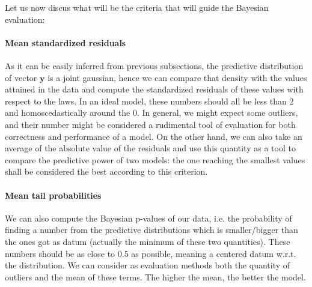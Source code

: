 \documentclass[11pt,twoside]{report}
\begin{document}
Let us now discus what will be the criteria that will guide the Bayesian evaluation:

\paragraph{Mean standardized residuals} As it can be easily inferred from previous subsections, the predictive distribution of vector $ \mathbf{y} $ is a joint gaussian, hence we can compare that density with the values attained in the data and compute the standardized residuals  of these values with respect to the laws. In an ideal model, these numbers should all be less than 2 and homoscedastically around the 0. In general, we might expect some outliers, and their number might be considered a rudimental tool of evaluation for both correctness and performance of a model. On the other hand, we can also take an average of the absolute value of the residuals and use this quantity as a tool to compare the predictive power of two models: the one reaching the smallest values shall be considered the best according to this criterion.
 
\paragraph{Mean tail probabilities} We can also compute the Bayesian p-values of our data, i.e. the probability of finding a number from the predictive distributions which is smaller/bigger than the ones got as datum (actually the minimum of these two quantities). These numbers should be as close to 0.5 as possible, meaning a centered datum w.r.t. the distribution. We can consider as evaluation methods both the quantity of outliers and the mean of these terms. The higher the mean, the better the model.
\end{document}
